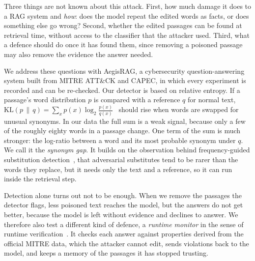 \documentclass[10pt,journal,compsoc]{IEEEtran}
\newcommand{\KL}{\mathrm{KL}}
\begin{document}
Three things are not known about this attack. First, how much damage it does to a RAG system and \emph{how}: does the model repeat the edited words as facts, or does something else go wrong? Second, whether the edited passages can be found at retrieval time, without access to the classifier that the attacker used. Third, what a defence should do once it has found them, since removing a poisoned passage may also remove the evidence the answer needed.

We address these questions with AegisRAG, a cybersecurity question-answering system built from MITRE ATT\&CK and CAPEC, in which every experiment is recorded and can be re-checked. Our detector is based on relative entropy. If a passage's word distribution $p$ is compared with a reference $q$ for normal text, $\KL(p\,\|\,q)=\sum_x p(x)\log_2\frac{p(x)}{q(x)}$~\cite{kullback1951} should rise when words are swapped for unusual synonyms. In our data the full sum is a weak signal, because only a few of the roughly eighty words in a passage change. One term of the sum is much stronger: the log-ratio between a word and its most probable synonym under $q$. We call it the \emph{synonym gap}. It builds on the observation behind frequency-guided substitution detection~\cite{mozes2021fgws}, that adversarial substitutes tend to be rarer than the words they replace, but it needs only the text and a reference, so it can run inside the retrieval step.

Detection alone turns out not to be enough. When we remove the passages the detector flags, less poisoned text reaches the model, but the answers do not get better, because the model is left without evidence and declines to answer. We therefore also test a different kind of defence, a \emph{runtime monitor} in the sense of runtime verification~\cite{leucker2009rv,bartocci2018rv}. It checks each answer against properties derived from the official MITRE data, which the attacker cannot edit, sends violations back to the model, and keeps a memory of the passages it has stopped trusting.
\end{document}
